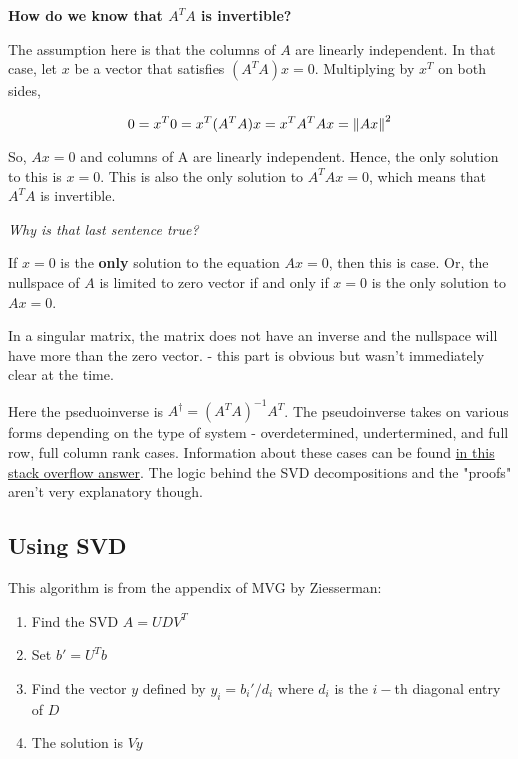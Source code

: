 \textbf{How do we know that $A^TA$ is invertible?}

The assumption here is that the columns of $A$ are linearly independent. In that case, let $x$ be a vector that satisfies $(A^TA)x=0$. Multiplying by $x^T$ on both sides,

\begin{equation*}
    0 = x^T0=x^T(A^TA)x=x^TA^TAx=\left\lVert Ax\right\rVert^2
\end{equation*}

So, $Ax=0$ and columns of A are linearly independent. Hence, the only solution to this is $x=0$. This is also the only solution to $A^TAx=0$, which means that $A^TA$ is invertible. 

\textit{Why is that last sentence true?}

If $x=0$ is the \textbf{only} solution to the equation $Ax=0$, then this is case. Or, the nullspace of $A$ is limited to zero vector if and only if $x=0$ is the only solution to $Ax=0$. 

In a singular matrix, the matrix does not have an inverse and the nullspace will have more than the zero vector. - this part is obvious but wasn't immediately clear at the time.

Here the pseduoinverse is $A^\dagger = (A^TA)^{-1}A^T$. The pseudoinverse takes on various forms depending on the type of system - overdetermined, undertermined, and full row, full column rank cases. Information about these cases can be found \href{https://math.stackexchange.com/questions/1537880/what-forms-does-the-moore-penrose-inverse-take-under-systems-with-full-rank-ful/2200203#2200203}{in this stack overflow answer}. The logic behind the SVD decompositions and the "proofs" aren't very explanatory though.

\subsection{Using SVD}

This algorithm is from the appendix of MVG by Ziesserman:

\begin{enumerate}
    \item Find the SVD $A=UDV^T$
    \item Set $b'=U^Tb$
    \item Find the vector $y$ defined by $y_i = b_i'/d_i$ where $d_i$ is the $i-$th diagonal entry of $D$
    \item The solution is $Vy$
\end{enumerate}

